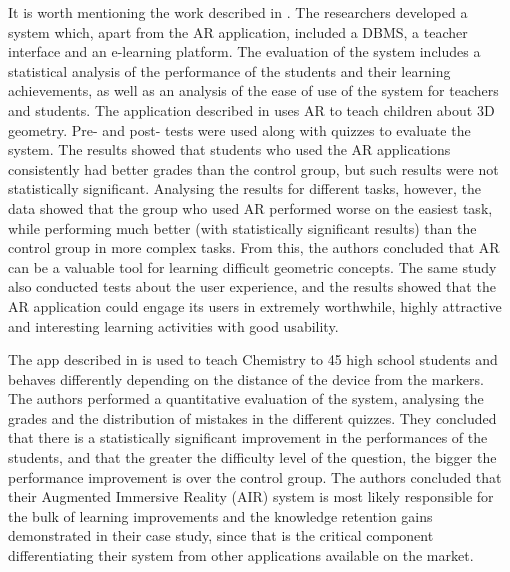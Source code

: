 \begin{table*}[ht!]
\begin{tabular}{>{\raggedright\arraybackslash}p{}p{}}
    \bottomrule
\end{tabular}
\end{table*}

%

It is worth mentioning the work described in \citep{chang2018impacts}. The researchers developed a system which, apart from the AR application, included a \gls{DBMS}, a teacher interface and an e-learning platform. The evaluation of the system includes a statistical analysis of the performance of the students and their learning achievements, as well as an analysis of the ease of use of the system for teachers and students. The application described in \cite{thamrongrat2019design} uses AR to teach children about 3D geometry. Pre- and post- tests were used along with quizzes to evaluate the system. The results showed that students who used the AR applications consistently had better grades than the control group, but such results were not statistically significant. Analysing the results for different tasks, however, the data showed that the group who used AR performed worse on the easiest task, while performing much better (with statistically significant results) than the control group in more complex tasks. From this, the authors concluded that AR can be a valuable tool for learning difficult geometric concepts. The same study also conducted tests about the user experience, and the results showed that the AR application could engage its users in extremely worthwhile, highly attractive and interesting learning activities with good usability.

The app described in \cite{cen2019augmented} is used to teach Chemistry to 45 high school students and behaves differently depending on the distance of the device from the markers. The authors performed a quantitative evaluation of the system, analysing the grades and the distribution of mistakes in the different quizzes. They concluded that there is a statistically significant improvement in the performances of the students, and that the greater the difficulty level of the question, the bigger the performance improvement is over the control group. The authors concluded that their Augmented Immersive Reality (AIR) system is most likely responsible for the bulk of learning improvements and the knowledge retention gains demonstrated in their case study, since that is the critical component differentiating their system from other applications available on the market.

